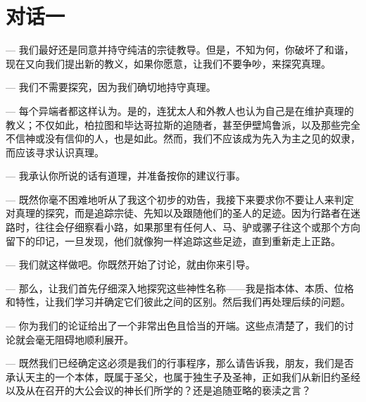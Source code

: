 
\section{对话一}

\par

— 我们最好还是同意并持守纯洁的宗徒教导。但是，不知为何，你破坏了和谐，现在又向我们提出新的教义，如果你愿意，让我们不要争吵，来探究真理。\par

— 我们不需要探究，因为我们确切地持守真理。\par

— 每个异端者都这样认为。是的，连犹太人和外教人也认为自己是在维护真理的教义；不仅如此，柏拉图和毕达哥拉斯的追随者，甚至伊壁鸠鲁派，以及那些完全不信神或没有信仰的人，也是如此。然而，我们不应该成为先入为主之见的奴隶，而应该寻求认识真理。\par

— 我承认你所说的话有道理，并准备按你的建议行事。\par

— 既然你毫不困难地听从了我这个初步的劝告，我接下来要求你不要让人来判定对真理的探究，而是追踪宗徒、先知以及跟随他们的圣人的足迹。因为行路者在迷路时，往往会仔细察看小路，如果那里有任何人、马、驴或骡子往这个或那个方向留下的印记，一旦发现，他们就像狗一样追踪这些足迹，直到重新走上正路。\par

— 我们就这样做吧。你既然开始了讨论，就由你来引导。\par

— 那么，让我们首先仔细深入地探究这些神性名称——我是指本体、本质、位格和特性，让我们学习并确定它们彼此之间的区别。然后我们再处理后续的问题。\par

— 你为我们的论证给出了一个非常出色且恰当的开端。这些点清楚了，我们的讨论就会毫无阻碍地顺利展开。\par

— 既然我们已经确定这必须是我们的行事程序，那么请告诉我，朋友，我们是否承认天主的一个本体，既属于圣父，也属于独生子及圣神，正如我们从新旧约圣经以及从在召开的大公会议的神长们所学的？还是追随亚略的亵渎之言？\par


